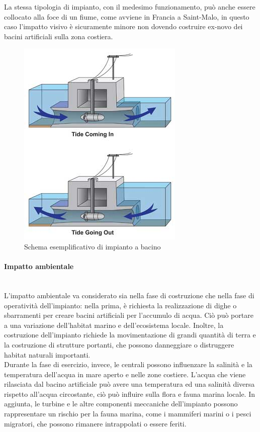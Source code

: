 La stessa tipologia di impianto, con il medesimo funzionamento, può anche essere collocato alla foce di un fiume, come avviene in Francia a Saint-Malo, in questo caso l'impatto visivo è sicuramente minore non dovendo costruire ex-novo dei bacini artificiali sulla zona costiera.\\
\begin{figure}[H]
    \centering
    \includegraphics[height=0.35\textwidth]{res/cap 3/Tidal-power-300}
    \caption{Schema esemplificativo di impianto a bacino}
\end{figure}\noindent
\vfill
\newpage
\paragraph{Impatto ambientale}\mbox{}\\
L'impatto ambientale va considerato sia nella fase di costruzione che nella fase di operatività dell'impianto: nella prima, è richiesta la realizzazione di dighe o sbarramenti per creare bacini artificiali per l'accumulo di acqua.
Ciò può portare a una variazione dell'habitat marino e dell'ecosistema locale. Inoltre, la costruzione dell'impianto richiede la movimentazione di grandi quantità di terra e la costruzione di strutture portanti, che possono danneggiare o distruggere habitat naturali importanti.\\
Durante la fase di esercizio, invece, le centrali possono influenzare la salinità e la temperatura dell'acqua in mare aperto e nelle zone costiere. L'acqua che viene rilasciata dal bacino artificiale può avere una temperatura ed una salinità diversa rispetto all'acqua circostante, ciò può influire sulla flora e fauna marina locale. In aggiunta, le turbine e le altre componenti meccaniche dell'impianto possono rappresentare un rischio per la fauna marina, come i mammiferi marini o i pesci migratori, che possono rimanere intrappolati o essere feriti.\\

